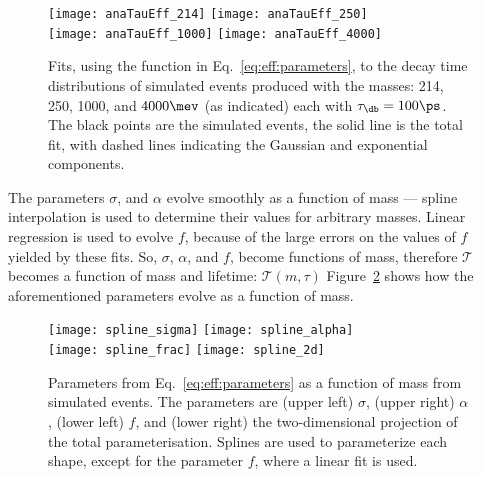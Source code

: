 \begin{figure}
  \begin{center}
    \texttt{[image: anaTauEff\_214]}
    \texttt{[image: anaTauEff\_250]}\\
    \texttt{[image: anaTauEff\_1000]}
    \texttt{[image: anaTauEff\_4000]}
    \caption[Decay time distributions for various dark boson masses]
    {
      Fits, using the function in Eq.~\protect\ref{eq:eff:parameters},
      to the decay time distributions of simulated events produced with the masses:
      214, 250, 1000, and $4000\mev$ (as indicated)
      each with $\tau_\db=100\ps$.
      The black points are the simulated events, the solid line is the total fit, with dashed lines
      indicating the Gaussian and exponential components.
    }
    \label{fig:eff:fits}
  \end{center}
\end{figure}

The parameters $\sigma$, and $\alpha$ evolve smoothly as a function of mass ---
spline interpolation is used to determine their values for arbitrary masses.
Linear regression is used to evolve $f$, because of the large errors on the values of $f$ yielded
by these fits.
So, $\sigma$, $\alpha$, and $f$, become functions of mass, therefore $\mathcal{T}$ becomes a
function of mass and lifetime: $\mathcal{T}(m,\tau)$
Figure~\ref{fig:eff:spline} shows how the aforementioned parameters evolve as a function of mass.

\begin{figure}
  \begin{center}
    \texttt{[image: spline\_sigma]}
    \texttt{[image: spline\_alpha]}\\
    \texttt{[image: spline\_frac]}
    \texttt{[image: spline\_2d]}
    \caption[Parameterisation of decay time acceptance as a function of mass]
    {
      Parameters from Eq.~\protect\ref{eq:eff:parameters} as a function of mass from
      simulated events.
      The parameters are
      (upper left) $\sigma$,
      (upper right) $\alpha$,
      (lower left) $f$, and
      (lower right) the two-dimensional projection of the total parameterisation.
      Splines are used to parameterize each shape, except for the parameter $f$, where a
      linear fit is used.
    }
    \label{fig:eff:spline}
  \end{center}
\end{figure}


